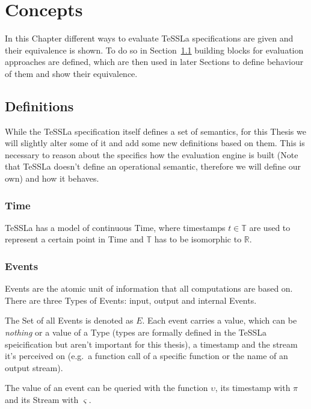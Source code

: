 \chapter{Concepts}
\label{sec:concepts}

In this Chapter different ways to evaluate TeSSLa specifications are given and their equivalence is shown.
To do so in Section~\ref{sec:concepts:defs} building blocks for evaluation approaches are defined, which are then used in later Sections to define behaviour of them and show their equivalence.

\section{Definitions}
\label{sec:concepts:defs}

While the TeSSLa specification itself defines a set of semantics, for this Thesis we will slightly alter some of it and add some new definitions based on them.
This is necessary to reason about the specifics how the evaluation engine is built (Note that TeSSLa doesn't define an operational semantic, therefore we will define our own) and how it behaves.

\subsection{Time}
\label{sec:concepts:defs:time}

TeSSLa has a model of continuous Time, where timestamps \(t \in \mathbb{T} \) are used to represent a certain point in Time and \(\mathbb{T}\) has to be isomorphic to \(\mathbb{R}\).

\subsection{Events}
\label{sec:concepts:defs:events}

Events are the atomic unit of information that all computations are based on.
There are three Types of Events: input, output and internal Events.

The Set of all Events is denoted as \(E\).
Each event carries a value, which can be \emph{nothing} or a value of a Type (types are formally defined in the TeSSLa speicification but aren't important for this thesis), a timestamp and the stream it's perceived on (e.g.\ a function call of a specific function or the name of an output stream).

The value of an event can be queried with the function \(\upsilon\), its timestamp with \(\pi\) and its Stream with \(\varsigma\).

